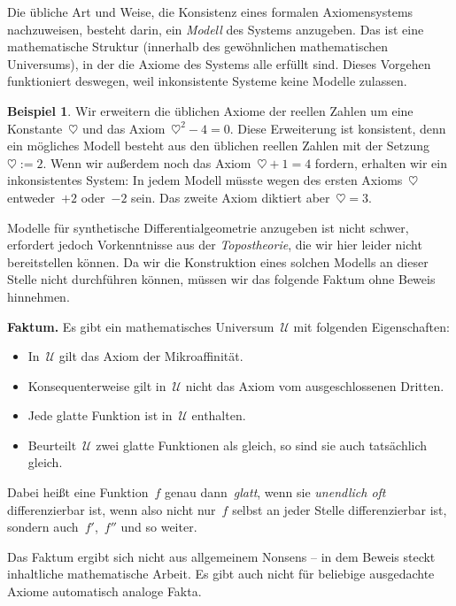 \documentclass[twoside]{../zirkelblatt}
\newcommand{\U}{\mathcal{U}}
\theoremstyle{definition}
\newtheorem{bsp}[defn]{Beispiel}
\theoremstyle{plain}
\theoremstyle{remark}
\begin{document}
Die übliche Art und Weise, die Konsistenz eines formalen Axiomensystems
nachzuweisen, besteht darin, ein \emph{Modell} des Systems anzugeben. Das ist
eine mathematische Struktur (innerhalb des gewöhnlichen mathematischen
Universums), in der die Axiome des Systems alle erfüllt sind.
Dieses Vorgehen funktioniert deswegen, weil inkonsistente Systeme keine Modelle
zulassen.

\begin{bsp}Wir erweitern die üblichen Axiome der reellen
Zahlen um eine Konstante~$\heartsuit$ und das Axiom~$\heartsuit^2 - 4 = 0$.
Diese Erweiterung ist konsistent, denn ein mögliches Modell besteht aus den
üblichen reellen Zahlen mit der Setzung~$\heartsuit := 2$. Wenn wir außerdem
noch das Axiom~$\heartsuit + 1 = 4$ fordern, erhalten wir ein inkonsistentes
System: In jedem Modell müsste wegen des ersten Axioms~$\heartsuit$
entweder~$+2$ oder~$-2$ sein. Das zweite Axiom diktiert aber~$\heartsuit =
3$.\end{bsp}

Modelle für synthetische Differentialgeometrie anzugeben ist nicht schwer,
erfordert jedoch Vorkenntnisse aus der \emph{Topostheorie}, die
wir hier leider nicht bereitstellen können. Da wir die Konstruktion eines solchen Modells
an dieser Stelle nicht durchführen können, müssen wir das folgende Faktum
ohne Beweis hinnehmen.

\begin{shaded}
\textbf{Faktum.} Es gibt ein mathematisches Universum~$\U$ mit folgenden
Eigenschaften:
\begin{itemize}
\item In~$\U$ gilt das Axiom der Mikroaffinität.
\item Konsequenterweise gilt in~$\U$ nicht das Axiom vom ausgeschlossenen
Dritten.
\item Jede glatte Funktion ist in~$\U$ enthalten.
\item Beurteilt~$\U$ zwei glatte Funktionen als gleich, so sind sie
auch tatsächlich gleich.
\label{fact:sdg-universum}
\end{itemize}
\end{shaded}

Dabei heißt eine Funktion~$f$ genau dann~\emph{glatt}, wenn sie \emph{unendlich
oft} differenzierbar ist, wenn also nicht nur~$f$ selbst an jeder Stelle
differenzierbar ist, sondern auch~$f'$,~$f''$ und so weiter.

Das Faktum ergibt sich nicht aus allgemeinem Nonsens -- in dem Beweis steckt
inhaltliche mathematische Arbeit. Es gibt auch nicht für beliebige
ausgedachte Axiome automatisch analoge Fakta.
\end{document}
